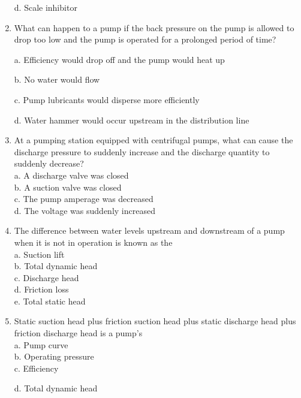 \begin{enumerate}[1.]
d. Scale inhibitor\\

\item What can happen to a pump if the back pressure on the pump is allowed to drop too low and the pump is operated for a prolonged period of time?

a. Efficiency would drop off and the pump would heat up

b. No water would flow

c. Pump lubricants would disperse more efficiently

d. Water hammer would occur upstream in the distribution line

\item At a pumping station equipped with centrifugal pumps, what can cause the discharge pressure to suddenly increase and the discharge quantity to suddenly decrease?\\
a. A discharge valve was closed\\
b. A suction valve was closed\\
c. The pump amperage was decreased\\
d. The voltage was suddenly increased\\

\item The difference between water levels upstream and downstream of a pump when it is not in operation is known as the\\

a. Suction lift\\

b. Total dynamic head\\

c. Discharge head\\

d. Friction loss\\

e. Total static head\\

\item Static suction head plus friction suction head plus static discharge head plus friction discharge head is a pump's\\

a. Pump curve\\

b. Operating pressure\\

c. Efficiency

d. Total dynamic head\\


\end{enumerate}
